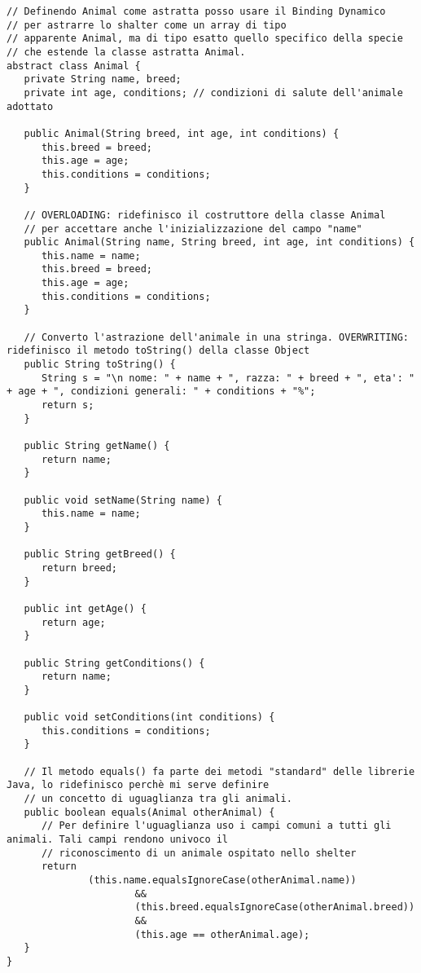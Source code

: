 \documentclass{article}
\begin{document}
	\begin{lstlisting}[caption={Animal.java}]
// Definendo Animal come astratta posso usare il Binding Dynamico 
// per astrarre lo shalter come un array di tipo
// apparente Animal, ma di tipo esatto quello specifico della specie 
// che estende la classe astratta Animal.
abstract class Animal {
   private String name, breed;
   private int age, conditions; // condizioni di salute dell'animale adottato

   public Animal(String breed, int age, int conditions) {
      this.breed = breed;
      this.age = age;
      this.conditions = conditions;
   }

   // OVERLOADING: ridefinisco il costruttore della classe Animal 
   // per accettare anche l'inizializzazione del campo "name"
   public Animal(String name, String breed, int age, int conditions) {
      this.name = name;
      this.breed = breed;
      this.age = age;
      this.conditions = conditions;
   }

   // Converto l'astrazione dell'animale in una stringa. OVERWRITING: ridefinisco il metodo toString() della classe Object
   public String toString() {
      String s = "\n nome: " + name + ", razza: " + breed + ", eta': " + age + ", condizioni generali: " + conditions + "%";
      return s;
   }

   public String getName() {
      return name;
   }

   public void setName(String name) {
      this.name = name;
   }

   public String getBreed() {
      return breed;
   }

   public int getAge() {
      return age;
   }

   public String getConditions() {
      return name;
   }

   public void setConditions(int conditions) {
      this.conditions = conditions;
   }

   // Il metodo equals() fa parte dei metodi "standard" delle librerie Java, lo ridefinisco perchè mi serve definire
   // un concetto di uguaglianza tra gli animali.
   public boolean equals(Animal otherAnimal) {
      // Per definire l'uguaglianza uso i campi comuni a tutti gli animali. Tali campi rendono univoco il
      // riconoscimento di un animale ospitato nello shelter
      return
              (this.name.equalsIgnoreCase(otherAnimal.name))
                      &&
                      (this.breed.equalsIgnoreCase(otherAnimal.breed))
                      &&
                      (this.age == otherAnimal.age);
   }
}



\end{lstlisting}
\end{document}
